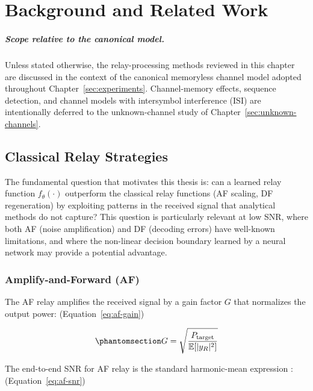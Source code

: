 \chapter{Background and Related Work}\label{sec:literature-review}

\paragraph{Scope relative to the canonical model.} Unless stated otherwise, the relay-processing methods reviewed in this chapter are discussed in the context of the canonical memoryless channel model adopted throughout Chapter~\ref{sec:experiments}. Channel-memory effects, sequence detection, and channel models with intersymbol interference (ISI) are intentionally deferred to the unknown-channel study of Chapter~\ref{sec:unknown-channels}.

\section{Classical Relay Strategies}\label{sec:classical-relay-strategies}

The fundamental question that motivates this thesis is: can a learned relay function \(f_\theta(\cdot)\) outperform the classical relay functions (AF scaling, DF regeneration) by exploiting patterns in the received signal that analytical methods do not capture? This question is particularly relevant at low SNR, where both AF (noise amplification) and DF (decoding errors) have well-known limitations, and where the non-linear decision boundary learned by a neural network may provide a potential advantage.

\subsection{Amplify-and-Forward (AF)}\label{sec:classical-relay-strategies-af}
The AF relay amplifies the received signal by a gain factor \(G\) that normalizes the output power: (Equation~\ref{eq:af-gain})

\begin{equation}\protect\phantomsection\label{eq:af-gain}{G = \sqrt{\frac{P_{\text{target}}}{\mathbb{E}[|y_R|^2]}}
}\end{equation}

The end-to-end SNR for AF relay is the standard harmonic-mean expression \cite{Laneman2004CooperativeDiversity,TseViswanath2005Fundamentals}: (Equation~\ref{eq:af-snr})


